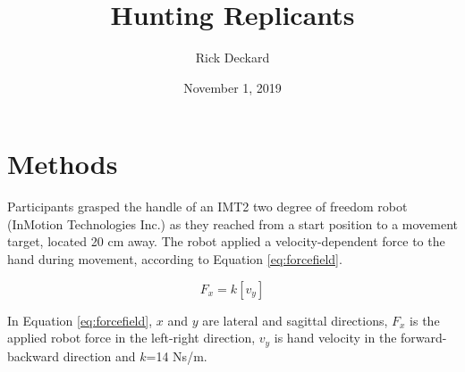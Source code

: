 \documentclass{article}
\title{Hunting Replicants}
\author{Rick Deckard}
\date{November 1, 2019}
\begin{document}
\maketitle

\section*{Methods}

Participants grasped the handle of an IMT2 two degree of freedom robot (InMotion Technologies Inc.) as they reached from a start position to a movement target, located 20 cm away. The robot applied a velocity-dependent force to the hand during movement, according to Equation \ref{eq:forcefield}.

\begin{equation}
    F_{x} = k \left[ v_{y} \right]
\label{eq:forcefield}
\end{equation}

In Equation \ref{eq:forcefield}, $x$ and $y$ are lateral and sagittal directions, $F_{x}$ is the applied robot force in the left-right direction, $v_{y}$ is hand velocity in the forward-backward direction and $k$=14 Ns/m.
\end{document}
